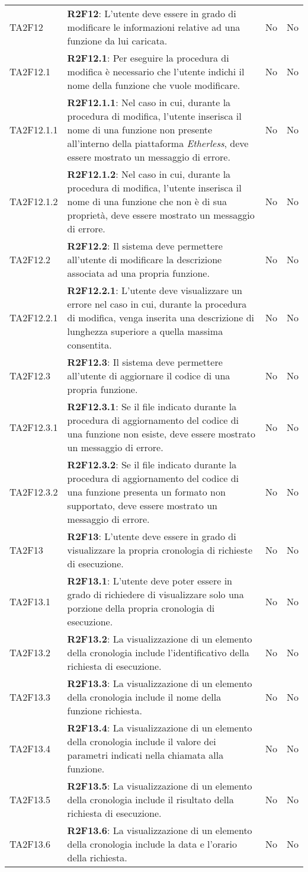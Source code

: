 \begin{longtable}{
		>{\centering}p{} 
		>{}p{}
		>{\centering}p{}
		>{\centering}p{} }
	TA2F12 		& \textbf{R2F12}: L'utente deve essere in grado di modificare le informazioni relative ad una funzione da lui caricata. 																	& No & No \tabularnewline
	TA2F12.1 	& \textbf{R2F12.1}: Per eseguire la procedura di modifica è necessario che l'utente indichi il nome della funzione che vuole modificare. 													& No & No \tabularnewline
	TA2F12.1.1 	& \textbf{R2F12.1.1}: Nel caso in cui, durante la procedura di modifica, l'utente inserisca il nome di una funzione non presente all'interno della piattaforma \textit{Etherless}, deve essere mostrato un messaggio di errore.	& No & No \tabularnewline
	TA2F12.1.2 	& \textbf{R2F12.1.2}: Nel caso in cui, durante la procedura di modifica, l'utente inserisca il nome di una funzione che non è di sua proprietà, deve essere 	mostrato un messaggio di errore. & No & No \tabularnewline
	TA2F12.2 	& \textbf{R2F12.2}: Il sistema deve permettere all'utente di modificare la descrizione associata ad una propria funzione. 																	& No & No \tabularnewline
	TA2F12.2.1 	& \textbf{R2F12.2.1}: L'utente deve visualizzare un errore nel caso in cui, durante la procedura di modifica, venga inserita una descrizione di lunghezza superiore a quella massima consentita. 	& No & No \tabularnewline
	TA2F12.3 	& \textbf{R2F12.3}: Il sistema deve permettere all'utente di aggiornare il codice di una propria funzione. 																				& No & No \tabularnewline
	TA2F12.3.1 	& \textbf{R2F12.3.1}: Se il file indicato durante la procedura di aggiornamento del codice di una funzione non esiste, deve essere mostrato un messaggio di errore.							& No & No \tabularnewline
	TA2F12.3.2 	& \textbf{R2F12.3.2}: Se il file indicato durante la procedura di aggiornamento del codice di una funzione presenta un formato non supportato, deve essere mostrato un messaggio di errore.	& No & No \tabularnewline

	TA2F13 		& \textbf{R2F13}: L'utente deve essere in grado di visualizzare la propria cronologia di richieste di esecuzione. 																		& No & No \tabularnewline
	TA2F13.1 	& \textbf{R2F13.1}: L'utente deve poter essere in grado di richiedere di visualizzare solo una porzione della propria cronologia di esecuzione. 											& No & No \tabularnewline
	TA2F13.2 	& \textbf{R2F13.2}: La visualizzazione di un elemento della cronologia include l'identificativo della richiesta di esecuzione. 															& No & No \tabularnewline
	TA2F13.3 	& \textbf{R2F13.3}: La visualizzazione di un elemento della cronologia include il nome della funzione richiesta. 																			& No & No \tabularnewline
	TA2F13.4 	& \textbf{R2F13.4}: La visualizzazione di un elemento della cronologia include il valore dei parametri indicati nella chiamata alla funzione.												& No & No \tabularnewline
	TA2F13.5 	& \textbf{R2F13.5}: La visualizzazione di un elemento della cronologia include il risultato della richiesta di esecuzione.																	& No & No \tabularnewline
	TA2F13.6 	& \textbf{R2F13.6}: La visualizzazione di un elemento della cronologia include la data e l'orario della richiesta. 																		& No & No \tabularnewline


\end{longtable}
